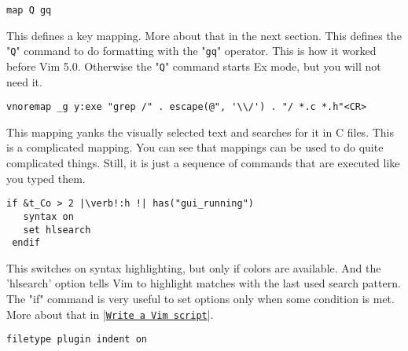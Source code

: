  \begin{Verbatim}[samepage=true]
 map Q gq
 \end{Verbatim}

This defines a key mapping.
More about that in the next section.
This defines the "\verb!Q!" command to do formatting with the "\verb!gq!" operator.
This is how it worked before Vim 5.0.
Otherwise the "\verb!Q!" command starts Ex mode, but you will not need it.

 \begin{Verbatim}[samepage=true]
 vnoremap _g y:exe "grep /" . escape(@", '\\/') . "/ *.c *.h"<CR>
 \end{Verbatim}

This mapping yanks the visually selected text and searches for it in C files.
This is a complicated mapping.
You can see that mappings can be used to do quite complicated things.
Still, it is just a sequence of commands that are executed like you typed them.

 \begin{Verbatim}[samepage=true]
 if &t_Co > 2 |\verb!:h !| has("gui_running")
   syntax on
   set hlsearch
 endif
 \end{Verbatim}

This switches on syntax highlighting, but only if colors are available.
And the 'hlsearch' option tells Vim to highlight matches with the last used search pattern.
The "if" command is very useful to set options only when some condition is met.
More about that in |\hyperref[Write a Vim script]{\texttt{Write a Vim script}}|.
\label{vimrc-filetype}
 \begin{Verbatim}[samepage=true]
 filetype plugin indent on
 \end{Verbatim}

